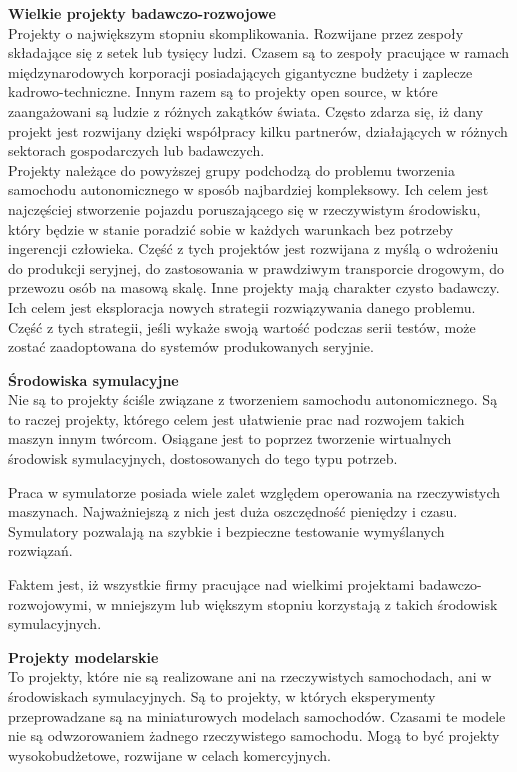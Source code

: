 \begin{enumerate*}
\item \textbf{Wielkie projekty badawczo-rozwojowe} \\
Projekty o największym stopniu skomplikowania. Rozwijane przez zespoły składające się z setek lub tysięcy ludzi. Czasem są to zespoły pracujące w ramach międzynarodowych korporacji posiadających gigantyczne budżety i zaplecze kadrowo-techniczne. Innym razem są to projekty open source, w które zaangażowani są ludzie z różnych zakątków świata. Często zdarza się, iż dany projekt jest rozwijany dzięki współpracy kilku partnerów, działających w różnych sektorach gospodarczych lub badawczych. \\
Projekty należące do powyższej grupy podchodzą do problemu tworzenia samochodu autonomicznego w sposób najbardziej kompleksowy. Ich celem jest najczęściej stworzenie pojazdu poruszającego się w rzeczywistym środowisku, który będzie w stanie poradzić sobie w każdych warunkach bez potrzeby ingerencji człowieka.
Część z tych projektów jest rozwijana z myślą o wdrożeniu do produkcji seryjnej, do zastosowania w prawdziwym transporcie drogowym, do przewozu osób na masową skalę.
Inne projekty mają charakter czysto badawczy. Ich celem jest eksploracja nowych strategii rozwiązywania danego problemu. Część z tych strategii, jeśli wykaże swoją wartość podczas serii testów, może zostać zaadoptowana do systemów produkowanych seryjnie. \\

\item \textbf{Środowiska symulacyjne} \\
Nie są to projekty ściśle związane z tworzeniem samochodu autonomicznego. Są to raczej projekty, którego celem jest ułatwienie prac nad rozwojem takich maszyn innym twórcom. Osiągane jest to poprzez tworzenie wirtualnych środowisk symulacyjnych, dostosowanych do tego typu potrzeb.

Praca w symulatorze posiada wiele zalet względem operowania na rzeczywistych maszynach. Najważniejszą z nich jest duża oszczędność pieniędzy i czasu. Symulatory pozwalają na szybkie i bezpieczne testowanie wymyślanych rozwiązań.

Faktem jest, iż wszystkie firmy pracujące nad wielkimi projektami badawczo-rozwojowymi, w mniejszym lub większym stopniu korzystają z takich środowisk symulacyjnych. \\

\item \textbf{Projekty modelarskie} \\
To projekty, które nie są realizowane ani na rzeczywistych samochodach, ani w środowiskach symulacyjnych. Są to projekty, w których eksperymenty przeprowadzane są na miniaturowych modelach samochodów. Czasami te modele nie są odwzorowaniem żadnego rzeczywistego samochodu. Mogą to być projekty wysokobudżetowe, rozwijane w celach komercyjnych. \\


\end{enumerate*}
